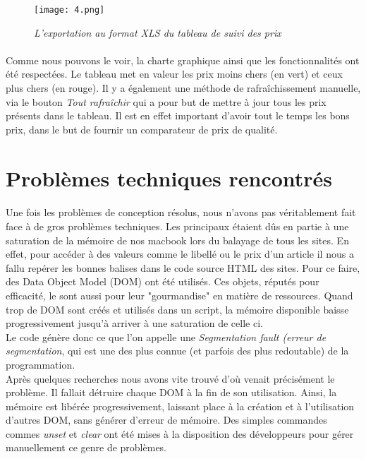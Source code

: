 \documentclass{report}
\begin{document}
\begin{figure}[H]
\begin{center}
\texttt{[image: 4.png]}
\caption{\textit{L'exportation au format XLS du tableau de suivi des prix}}
\end{center}
\end{figure}

\paragraph{}
Comme nous pouvons le voir, la charte graphique ainsi que les fonctionnalités ont été respectées. Le tableau met en valeur les prix moins chers (en vert) et ceux plus chers (en rouge). Il y a également une méthode de rafraîchissement manuelle, via le bouton \textit{Tout rafraîchir} qui a pour but de mettre à jour tous les prix présents dans le tableau. Il est en effet important d'avoir tout le temps les bons prix, dans le but de fournir un comparateur de prix de qualité.

\section{Problèmes techniques rencontrés}

\paragraph{}
Une fois les problèmes de conception résolus, nous n'avons pas véritablement fait face à de gros problèmes techniques. Les principaux étaient dûs en partie à une saturation de la mémoire de nos macbook lors du balayage de tous les sites. En effet, pour accéder à des valeurs comme le libellé ou le prix d'un article il nous a fallu repérer les bonnes balises dans le code source HTML des sites. Pour ce faire, des Data Object Model (DOM) ont été utilisés. Ces objets, réputés pour efficacité, le sont aussi pour leur "gourmandise" en matière de ressources. Quand trop de DOM sont créés et utilisés dans un script, la mémoire disponible baisse progressivement jusqu'à arriver à une saturation de celle ci.\\
Le code génère donc ce que l'on appelle une \textit{Segmentation fault (erreur de segmentation}, qui est une des plus connue (et parfois des plus redoutable) de la programmation.\\
Après quelques recherches nous avons vite trouvé d'où venait précisément le problème. Il fallait détruire chaque DOM à la fin de son utilisation. Ainsi, la mémoire est libérée progressivement, laissant place à la création et à l'utilisation d'autres DOM, sans générer d'erreur de mémoire. Des simples commandes commes \textit{unset} et \textit{clear} ont été mises à la disposition des développeurs pour gérer manuellement ce genre de problèmes.
\end{document}
